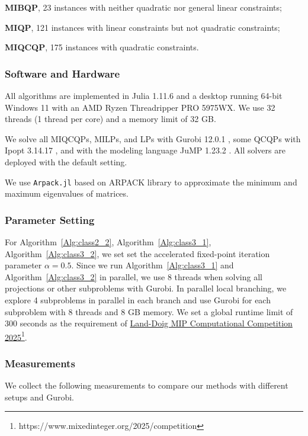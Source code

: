 \documentclass[]{article}
\begin{document}
\textbf{MIBQP}, 23 instances with neither quadratic nor general linear constraints;

\textbf{MIQP}, 121 instances with linear constraints but not quadratic constraints;

\textbf{MIQCQP}, 175 instances with quadratic constraints.

\subsubsection{Software and Hardware}\label{sec:software}
All algorithms are implemented in Julia 1.11.6 \cite{bezanson2017julia} and a desktop running 64-bit Windows 11 with an AMD Ryzen Threadripper PRO 5975WX. We use 32 threads (1 thread per core) and a memory limit of 32 GB. 

We solve all MIQCQPs, MILPs, and LPs with Gurobi 12.0.1 \cite{gurobi}, some QCQPs with Ipopt 3.14.17 \cite{ipopt}, and with the modeling language JuMP 1.23.2 \cite{jump}. All solvers are deployed with the default setting.

We use \texttt{Arpack.jl} based on ARPACK library \cite{lehoucq1998arpack} to approximate the minimum and maximum eigenvalues of matrices.

\subsubsection{Parameter Setting}\label{sec:parameter}
For Algorithm~\ref{Alg:class2_2}, Algorithm~\ref{Alg:class3_1}, Algorithm~\ref{Alg:class3_2}, we set set the accelerated fixed-point iteration \cite{walker2011anderson} parameter $\alpha = 0.5$. Since we run Algorithm~\ref{Alg:class3_1} and Algorithm~\ref{Alg:class3_2} in parallel, we use 8 threads when solving all projections or other subproblems with Gurobi. In parallel local branching, we explore 4 subproblems in parallel in each branch and use Gurobi for each subproblem with 8 threads and 8 GB memory. We set a global runtime limit of $300$ seconds as the requirement of \href{https://github.com/foreverdyz/primalheuristic\_miqcqp}{Land-Doig MIP Computational Competition 2025}\footnote{https://www.mixedinteger.org/2025/competition}.

\subsubsection{Measurements}
We collect the following measurements to compare our methods with different setups and Gurobi.
\end{document}
